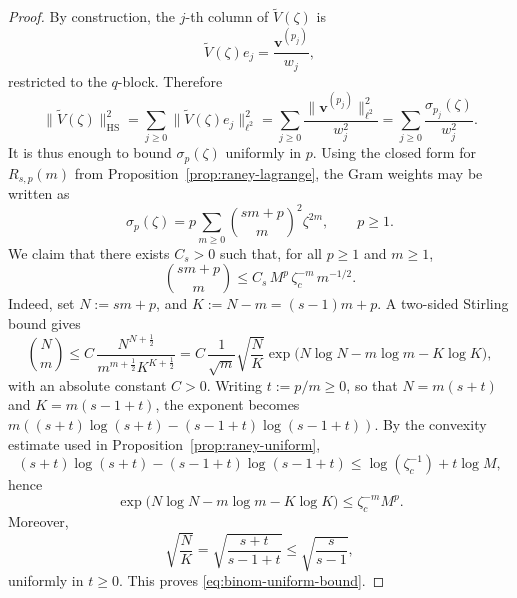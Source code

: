 \documentclass[11pt]{amsart}
\numberwithin{equation}{section}
\theoremstyle{plain}
\theoremstyle{definition}
\theoremstyle{remark}
\begin{document}
\begin{proof}
	By construction, the \(j\)-th column of \(\widetilde V(\zeta)\) is
	\[
		\widetilde V(\zeta)e_j
		=
		\frac{\bm v^{(p_j)}}{w_j},
	\]
	restricted to the \(q\)-block. Therefore
	\begin{equation}\label{eq:HS-sigma-sum}
		\|\widetilde V(\zeta)\|_{\mathrm{HS}}^2
		=
		\sum_{j\ge0}\|\widetilde V(\zeta)e_j\|_{\ell^2}^2
		=
		\sum_{j\ge0}\frac{\|\bm v^{(p_j)}\|_{\ell^2}^2}{w_j^2}
		=
		\sum_{j\ge0}\frac{\sigma_{p_j}(\zeta)}{w_j^2}.
	\end{equation}
	It is thus enough to bound \(\sigma_p(\zeta)\) uniformly in \(p\). Using the closed form for \(R_{s,p}(m)\) from
	Proposition~\ref{prop:raney-lagrange}, the Gram weights may be written as
	\begin{equation}\label{eq:sigma-binomial-form}
		\sigma_p(\zeta)
		=
		p\sum_{m\ge0}\binom{sm+p}{m}^2\zeta^{2m},
		\qquad p\ge1.
	\end{equation}
	We claim that there exists \(C_s>0\) such that, for all \(p\ge1\) and
	\(m\ge1\),
	\begin{equation}\label{eq:binom-uniform-bound}
		\binom{sm+p}{m}
		\le
		C_s\,M^p\,\zeta_c^{-m}\,m^{-1/2}.
	\end{equation}
	Indeed, set $
		N:=sm+p$, and $K:=N-m=(s-1)m+p$.
	A two-sided Stirling bound gives
	\[
		\binom{N}{m}
		\le
		C\,\frac{N^{N+\frac12}}{m^{m+\frac12}K^{K+\frac12}}
		=
		C\,\frac1{\sqrt m}\sqrt{\frac NK}
		\exp\bigl(N\log N-m\log m-K\log K\bigr),
	\]
	with an absolute constant \(C>0\). Writing \(t:=p/m\ge0\), so that
	\(N=m(s+t)\) and \(K=m(s-1+t)\), the exponent becomes $
		m((s+t)\log(s+t)-(s-1+t)\log(s-1+t))$.
	By the convexity estimate used in
	Proposition~\ref{prop:raney-uniform},
	\[
		(s+t)\log(s+t)-(s-1+t)\log(s-1+t)
		\le
		\log(\zeta_c^{-1})+t\log M,
	\]
	hence
	\[
		\exp\bigl(N\log N-m\log m-K\log K\bigr)
		\le
		\zeta_c^{-m}M^p.
	\]
	Moreover,
	\[
		\sqrt{\frac NK}
		=
		\sqrt{\frac{s+t}{s-1+t}}
		\le
		\sqrt{\frac{s}{s-1}},
	\]
	uniformly in \(t\ge0\). This proves \eqref{eq:binom-uniform-bound}.


\end{proof}
\end{document}

